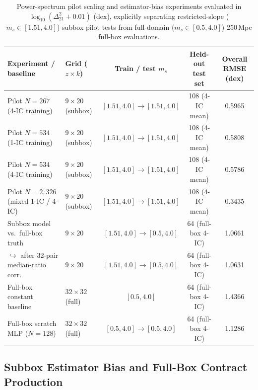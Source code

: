\documentclass[aps,prd,reprint,superscriptaddress,nofootinbib,amsmath,amssymb,floatfix,longbibliography]{revtex4-2}
\begin{document}
\begin{table}[!tb]
\caption{Power-spectrum pilot scaling and estimator-bias experiments evaluated in $\log_{10}(\Delta^2_{21}+0.01)$ ($\mathrm{dex}$), explicitly separating restricted-slope ($m_s \in [1.51, 4.0]$) subbox pilot tests from full-domain ($m_s \in [0.5, 4.0]$) 250\,Mpc full-box evaluations.}
\label{tab:ps_pilot}
\footnotesize
\setlength{\tabcolsep}{3.5pt}
\begin{ruledtabular}
\begin{tabular}{llccc}
Experiment / baseline & Grid ($z \times k$) & Train / test $m_s$ & Held-out test set & Overall RMSE (dex) \\
\hline
Pilot $N=267$ (4-IC training) & $9 \times 20$ (subbox) & $[1.51,4.0] \to [1.51,4.0]$ & 108 (4-IC mean) & 0.5965 \\
Pilot $N=534$ (1-IC training) & $9 \times 20$ (subbox) & $[1.51,4.0] \to [1.51,4.0]$ & 108 (4-IC mean) & 0.5808 \\
Pilot $N=534$ (4-IC training) & $9 \times 20$ (subbox) & $[1.51,4.0] \to [1.51,4.0]$ & 108 (4-IC mean) & 0.5786 \\
Pilot $N=2{,}326$ (mixed 1-IC / 4-IC) & $9 \times 20$ (subbox) & $[1.51,4.0] \to [1.51,4.0]$ & 108 (4-IC mean) & 0.3435 \\
Subbox model vs.\ full-box truth & $9 \times 20$ & $[1.51,4.0] \to [0.5,4.0]$ & 64 (full-box 4-IC) & 1.0661 \\
$\hookrightarrow$ after 32-pair median-ratio corr. & $9 \times 20$ & $[1.51,4.0] \to [0.5,4.0]$ & 64 (full-box 4-IC) & 1.0631 \\
Full-box constant baseline & $32 \times 32$ (full) & $[0.5,4.0]$ & 64 (full-box 4-IC) & 1.4366 \\
Full-box scratch MLP ($N=128$) & $32 \times 32$ (full) & $[0.5,4.0] \to [0.5,4.0]$ & 64 (full-box 4-IC) & 1.1286 \\
\end{tabular}
\end{ruledtabular}
\end{table}

\subsection{Subbox Estimator Bias and Full-Box Contract Production}\label{sec:ps_estimator}
\end{document}
